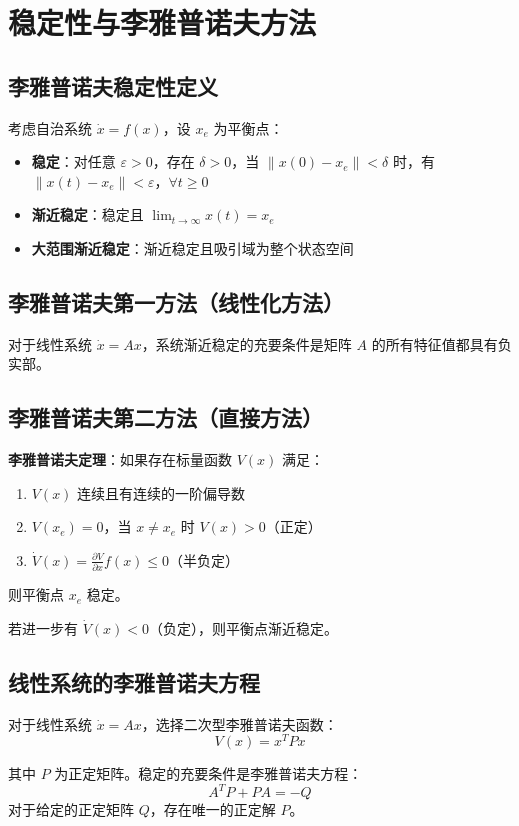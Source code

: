 \section{稳定性与李雅普诺夫方法}

\subsection{李雅普诺夫稳定性定义}
考虑自治系统 $\dot{x} = f(x)$，设 $x_e$ 为平衡点：
\begin{itemize}
    \item \textbf{稳定}：对任意 $\varepsilon > 0$，存在 $\delta > 0$，当 $\|x(0) - x_e\| < \delta$ 时，有 $\|x(t) - x_e\| < \varepsilon$，$\forall t \geq 0$
    \item \textbf{渐近稳定}：稳定且 $\lim_{t \to \infty} x(t) = x_e$
    \item \textbf{大范围渐近稳定}：渐近稳定且吸引域为整个状态空间
\end{itemize}

\subsection{李雅普诺夫第一方法（线性化方法）}
对于线性系统 $\dot{x} = Ax$，系统渐近稳定的充要条件是矩阵 $A$ 的所有特征值都具有负实部。

\subsection{李雅普诺夫第二方法（直接方法）}
\textbf{李雅普诺夫定理}：如果存在标量函数 $V(x)$ 满足：
\begin{enumerate}
    \item $V(x)$ 连续且有连续的一阶偏导数
    \item $V(x_e) = 0$，当 $x \neq x_e$ 时 $V(x) > 0$（正定）
    \item $\dot{V}(x) = \frac{\partial V}{\partial x} f(x) \leq 0$（半负定）
\end{enumerate}
则平衡点 $x_e$ 稳定。

若进一步有 $\dot{V}(x) < 0$（负定），则平衡点渐近稳定。

\subsection{线性系统的李雅普诺夫方程}
对于线性系统 $\dot{x} = Ax$，选择二次型李雅普诺夫函数：
\[V(x) = x^T P x\]

其中 $P$ 为正定矩阵。稳定的充要条件是李雅普诺夫方程：
\[A^T P + PA = -Q\]
对于给定的正定矩阵 $Q$，存在唯一的正定解 $P$。
